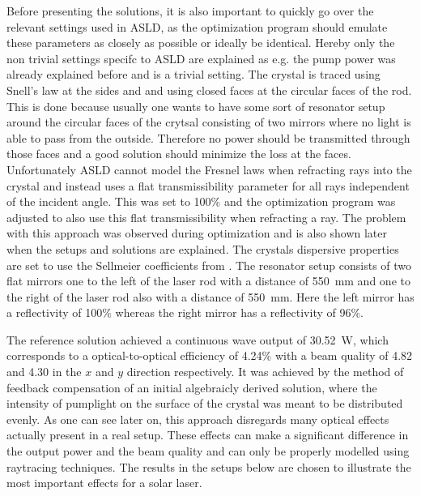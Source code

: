 \documentclass[a4paper,10pt]{article}
\begin{document}
    Before presenting the solutions, it is also important to quickly go
    over the relevant settings used
    in ASLD, as the optimization program should emulate these parameters
    as closely as possible or ideally be identical.
    Hereby only the non trivial settings specifc to ASLD are explained 
    as e.g. the pump power was already explained before and is a trivial
    setting.
    The crystal is traced using Snell's law at the sides and
    and using closed faces at the circular faces of the rod.
    This is done because usually one wants to have some sort of resonator
    setup around the circular faces of the crytsal consisting of 
    two mirrors where no light is able to pass from the outside.
    Therefore no power should be transmitted through those faces
    and a good solution should minimize the loss at the faces.
    Unfortunately ASLD cannot model the Fresnel laws when refracting
    rays into the crystal and instead uses a flat transmissibility 
    parameter for all rays independent of the incident angle.
    This was set to 100\% and the optimization program was adjusted
    to also use this flat transmissibility when refracting a ray.
    The problem with this approach was observed during optimization
    and is also shown later when the setups and solutions are explained.
    The crystals dispersive properties are set to use the Sellmeier
    coefficients from \cite{sellmeier_ndyag}.
    The resonator setup consists of two flat mirrors one to the left of
    the laser rod with a distance of \SI{550}{mm} and one to the right
    of the laser rod also with a distance of \SI{550}{mm}.
    Here the left mirror has a reflectivity of 100\% whereas
    the right mirror has a reflectivity of 96\%.

    The reference solution achieved a continuous wave output of
    \SI{30.52}{W}, which corresponds to a optical-to-optical
    efficiency of 4.24\% with a beam quality of 4.82 
    and 4.30 in the $x$ and $y$ direction respectively.
    It was achieved by the method of feedback compensation of an 
    initial algebraicly derived solution, where the intensity
    of pumplight on the surface of the crystal was meant to be
    distributed evenly.
    As one can see later on, this approach disregards many optical
    effects actually present in a real setup.
    These effects can make a significant difference in the output
    power and the beam quality and can only be properly modelled
    using raytracing techniques.
    The results in the setups below are chosen to illustrate
    the most important effects for a solar laser.
\end{document}
